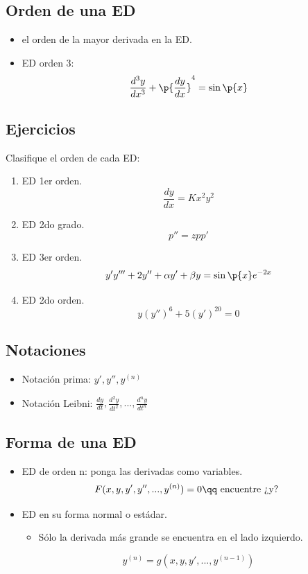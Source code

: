 \subsection{Orden de una ED}
\begin{itemize}
    \item el orden de la mayor derivada en la ED.
    \item ED orden 3: 
        \[
          \frac{d ^3y}{d x^3} + \p{\frac{d y}{d x} } ^4=\sin\p{ x } 
        \]
\end{itemize}

\subsection{Ejercicios}
Clasifique el orden de cada ED:
\begin{enumerate}
    \item ED 1er orden.
        \[
          \frac{d y}{d x} = Kx^2y^2
        \]
    
    \item ED 2do grado.
        \[
            p''=zpp'
        \]
    
    \item ED 3er orden.
        \[
          y'y'''+2y''+\alpha y' + \beta y = \sin\p{ x } e^{-2x}
        \]
    
    \item ED 2do orden.
        \[
            y(y'')^6+5(y')^20=0
        \]
\end{enumerate}

\subsection{Notaciones}
\begin{itemize}
    \item Notación prima: $\displaystyle y',y'',y^{(n)}$
    \item Notación Leibni: $\displaystyle \frac{d y}{d t} , \frac{d ^2y}{d t^2} , ... , \frac{d ^ny}{d t^n} $
\end{itemize}

\subsection{Forma de una ED}
\begin{itemize}
    \item ED de orden n: ponga las derivadas como variables.
        \[
          F(x, y,y',y'',...,y^{(n)}) = 0 \qq \text{ encuentre ¿y? }
        \]
    
    \item ED en su forma normal o estádar.
        \begin{itemize}
            \item Sólo la derivada más grande se encuentra en el lado izquierdo.
        \end{itemize}
        \[
            y^{(n)}=g(x,y,y',...,y^{(n-1)})
        \]
\end{itemize}

